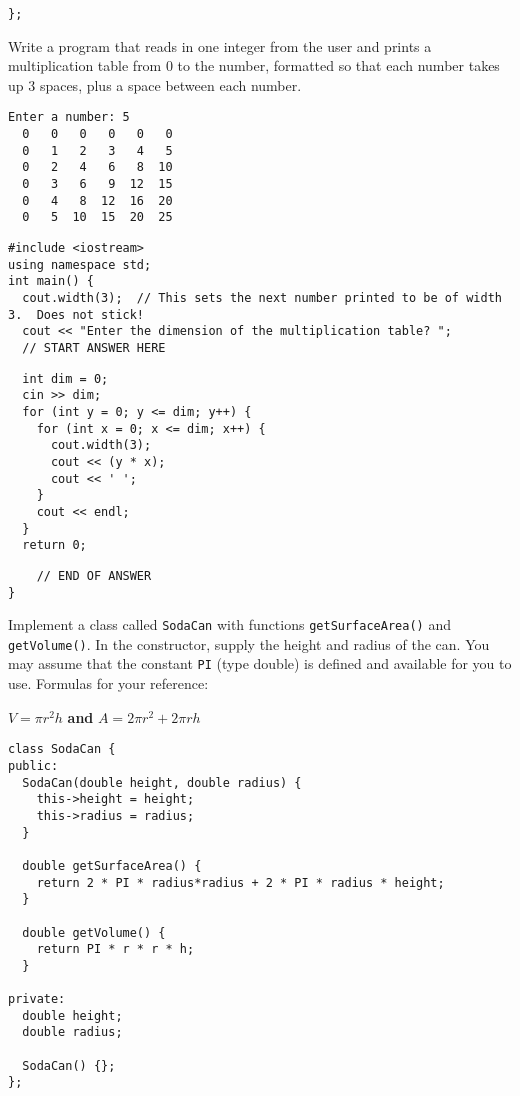 \documentclass[11pt,answers]{exam}
\begin{document}
\begin{questions}
\begin{verbatim}
};
\end{verbatim}

\newpage

\question[20] Write a program that reads in one integer from the user and prints a multiplication table from 0 to the number, formatted so that each number takes up 3 spaces, plus a space between each number. \newline
\begin{verbatim}
Enter a number: 5
  0   0   0   0   0   0 
  0   1   2   3   4   5 
  0   2   4   6   8  10 
  0   3   6   9  12  15 
  0   4   8  12  16  20 
  0   5  10  15  20  25
\end{verbatim}

\begin{verbatim}
#include <iostream>
using namespace std;
int main() {
  cout.width(3);  // This sets the next number printed to be of width 3.  Does not stick!
  cout << "Enter the dimension of the multiplication table? "; 
  // START ANSWER HERE
\end{verbatim}

\begin{solution}[4.5in]
\begin{verbatim}
  int dim = 0;
  cin >> dim;
  for (int y = 0; y <= dim; y++) {
    for (int x = 0; x <= dim; x++) {
      cout.width(3);
      cout << (y * x);
      cout << ' ';
    }
    cout << endl;
  }
  return 0;
\end{verbatim}
\end{solution}

\begin{verbatim}
    // END OF ANSWER
}
\end{verbatim}


\newpage
\bonusquestion[15] Implement a class called {\tt SodaCan} with functions {\tt getSurfaceArea()} and {\tt getVolume()}. In the constructor, supply the height and radius of the can. You may assume that the constant {\tt PI} (type double) is defined and available for you to use. Formulas for your reference:
\begin{center} 
  $V = \pi r^2h$ {\bf and} $A = 2 \pi r^2 + 2 \pi r h$
\end{center}

\begin{solution}
\begin{lstlisting}
class SodaCan {
public:
  SodaCan(double height, double radius) {
    this->height = height;
    this->radius = radius;
  }

  double getSurfaceArea() {
    return 2 * PI * radius*radius + 2 * PI * radius * height;	
  }

  double getVolume() {
	return PI * r * r * h;
  }

private: 
  double height;
  double radius;

  SodaCan() {};
};
\end{lstlisting}
\end{solution}

\end{questions}
\end{document}

